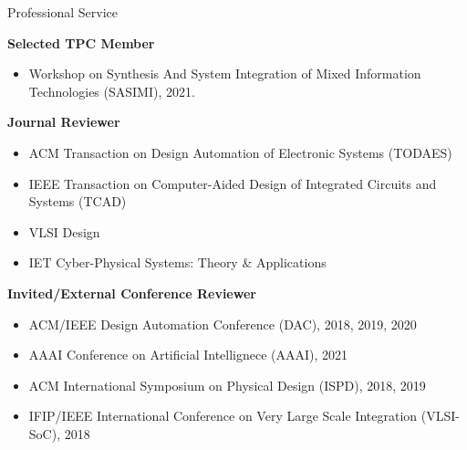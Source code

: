 
\begin{rSection}{Professional Service}

\textbf{Selected TPC Member}
\begin{itemize}
    \item Workshop on Synthesis And System Integration of Mixed Information Technologies (SASIMI), 2021.
\end{itemize}


\textbf{Journal Reviewer}
\begin{itemize}
    \item ACM Transaction on Design Automation of Electronic Systems (TODAES)
    \item IEEE Transaction on Computer-Aided Design of Integrated Circuits and Systems (TCAD)
    \item VLSI Design
    \item IET Cyber-Physical Systems: Theory \& Applications
\end{itemize}

\textbf{Invited/External Conference Reviewer}
\begin{itemize}
    \item ACM/IEEE Design Automation Conference (DAC), 2018, 2019, 2020
    \item AAAI Conference on Artificial Intellignece (AAAI), 2021
    \item ACM International Symposium on Physical Design (ISPD), 2018, 2019
    \item IFIP/IEEE International Conference on Very Large Scale Integration (VLSI-SoC), 2018
\end{itemize}
\end{rSection}


